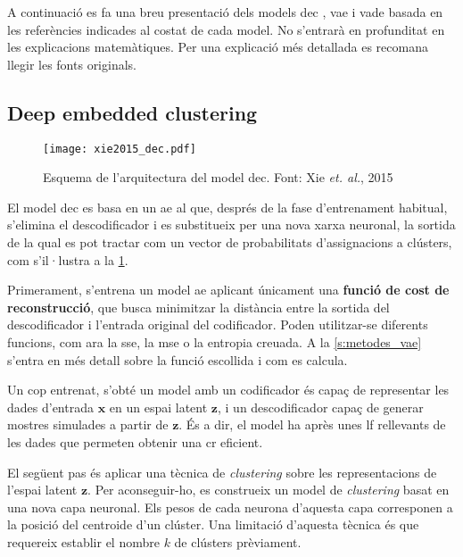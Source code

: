 \documentclass[CAT,BIB]{TFUOC}%
\begin{document}
    A continuació es fa una breu presentació dels models
    \gls{dec} \citep{Xie2015}, \gls{vae} \citep{Kingma2014,Kingma2019} i \gls{vade} \citep{Jiang2020}
    basada en les referències indicades al costat de cada model.
    No s'entrarà en profunditat en les explicacions matemàtiques.
    Per una explicació més detallada es recomana llegir les fonts originals.


    \subsection{Deep embedded clustering}
    \label{s:metodes_dec}

        \begin{figure}
            \centering
            \texttt{[image: xie2015\_dec.pdf]}
            \caption[Arquitectura del model DEC mantenint]{
                Esquema de l'arquitectura del model \gls{dec}.
                Font: Xie \textit{et. al.}, 2015 \citep{Xie2015}
            }
            \label{f:dec_xie2015}
        \end{figure}

        El model \gls{dec} es basa en un \gls{ae}
        al que, després de la fase d'entrenament habitual,
        s'elimina el descodificador i
        es substitueix per una nova xarxa neuronal,
        la sortida de la qual es pot tractar
        com un vector de probabilitats d'assignacions a clústers,
        com s'il·lustra a la \cref{f:dec_xie2015}.

        Primerament,
        s'entrena un model \gls{ae}
        aplicant únicament una \textbf{funció de cost de reconstrucció},
        que busca minimitzar la distància entre la sortida del descodificador
        i l'entrada original del codificador.
        Poden utilitzar-se diferents funcions,
        com ara la \gls{sse},
        la \gls{mse}
        o la entropia creuada.
        A la \cref{s:metodes_vae} s'entra en més detall
        sobre la funció escollida i com es calcula.

        Un cop entrenat,
        s'obté un model amb un codificador
        és capaç de representar les dades d'entrada $\mathbf{x}$
        en un espai latent $\mathbf{z}$,
        i un descodificador capaç de generar mostres simulades
        a partir de $\mathbf{z}$.
        És a dir, el model ha après unes \gls{lf} rellevants de les dades
        que permeten obtenir una \gls{cr} eficient.

        El següent pas és aplicar una tècnica de \textit{clustering}
        sobre les representacions de l'espai latent $\mathbf{z}$.
        Per aconseguir-ho,
        es construeix un model de \textit{clustering}
        basat en una nova capa neuronal.
        Els pesos de cada neurona d'aquesta capa
        corresponen a la posició del centroide d'un clúster.
        Una limitació d'aquesta tècnica és que requereix
        establir el nombre $k$ de clústers prèviament.
\end{document}
